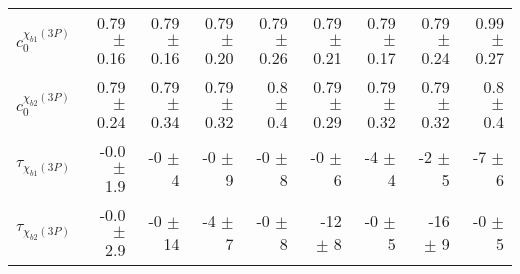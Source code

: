 \begin{table}[H]
{\begin{tabular}{lrrrrrrrr}
\rule{0pt}{4ex}$c_0^{\chi_{b1}(3P)}$ & 0.79 $\pm$ 0.16 & 0.79 $\pm$ 0.16 & 0.79 $\pm$ 0.20 & 0.79 $\pm$ 0.26 & 0.79 $\pm$ 0.21 & 0.79 $\pm$ 0.17 & 0.79 $\pm$ 0.24 & 0.99 $\pm$ 0.27\\
$c_0^{\chi_{b2}(3P)}$ & 0.79 $\pm$ 0.24 & 0.79 $\pm$ 0.34 & 0.79 $\pm$ 0.32 & 0.8 $\pm$ 0.4 & 0.79 $\pm$ 0.29 & 0.79 $\pm$ 0.32 & 0.79 $\pm$ 0.32 & 0.8 $\pm$ 0.4\\

\rule{0pt}{4ex}$\tau_{\chi_{b1}(3P)}$ & -0.0 $\pm$ 1.9 & -0 $\pm$ 4 & -0 $\pm$ 9 & -0 $\pm$ 8 & -0 $\pm$ 6 & -4 $\pm$ 4 & -2 $\pm$ 5 & -7 $\pm$ 6\\
$\tau_{\chi_{b2}(3P)}$ & -0.0 $\pm$ 2.9 & -0 $\pm$ 14 & -4 $\pm$ 7 & -0 $\pm$ 8 & -12 $\pm$ 8 & -0 $\pm$ 5 & -16 $\pm$ 9 & -0 $\pm$ 5\\
\bottomrule
\end{tabular}
} %
\label{tab:mc:chib3p_ups3s:fits}
\end{table}

